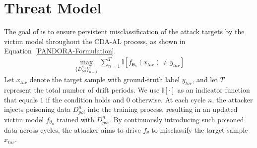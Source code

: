 \section{Threat Model}
\label{Sec: Threat Model}

The goal of \pandora is to ensure persistent misclassification of the attack targets by the victim model throughout the CDA-AL process, as shown in Equation~\ref{PANDORA-Formulation}.
\begin{equation}
	\begin{aligned}
			\max_{ \{ D_{poi}^{n} \}_{n=1}^{T} } \sum_{n=1}^{T} \mathbb{I}[ f_{\bm{\theta}_{n}}(x_{tar}) \neq y_{tar} ]
	\end{aligned}
	\label{PANDORA-Formulation}
\end{equation}
Let $x_{tar}$ denote the target sample with ground-truth label $y_{tar}$, and let $T$ represent the total number of drift periods.
We use $\mathbb{I}[\cdot]$ as an indicator function that equals $1$ if the condition holds and $0$ otherwise.
At each cycle $n$, the attacker injects poisoning data $D_{poi}^{n}$ into the training process, resulting in an updated victim model $f_{\theta_{n}}$ trained with $D_{poi}^{n}$.
By continuously introducing such poisoned data across cycles, the attacker aims to drive $f_{\theta}$ to misclassify the target sample $x_{tar}$.

